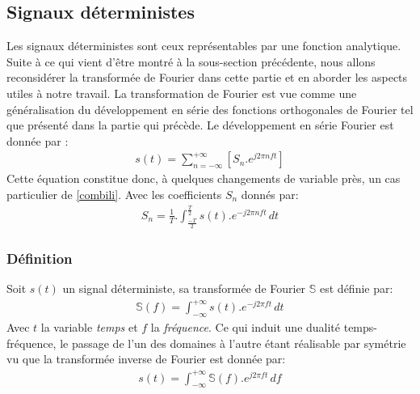 \subsection{Signaux déterministes}
Les signaux déterministes sont ceux représentables par une fonction analytique. Suite à ce qui vient d'être montré à la sous-section précédente, nous allons reconsidérer la transformée de Fourier dans cette partie et en aborder les aspects utiles à notre travail.
La transformation de Fourier est vue comme une généralisation du développement en série des fonctions orthogonales de Fourier tel que présenté dans la partie qui précède.
Le développement en série Fourier est donnée par \cite{Piskounov}:
\begin{eqnarray}\label{SrFourier}
s(t) = \sum_{n = -\infty}^{+\infty}[S_{n}.e^{j2{\pi}nft}]
\end{eqnarray}
Cette équation constitue donc, à quelques changements de variable près, un cas particulier de \ref{combili}.
Avec les coefficients $ S_{n} $ donnés par:
\begin{eqnarray}\label{CoefFourier}
S_{n}=\frac{1}{T}.\int_{\frac{-T}{2}}^{\frac{T}{2}}s(t).e^{-j2{\pi}nft}\,dt
\end{eqnarray}\newpage
\subsubsection{Définition \cite{KrCourse}}
Soit $ s(t) $ un signal déterministe, sa transformée de Fourier $ \mathbb{S} $ est définie par:
\begin{eqnarray}\label{TrFourier}
\mathbb{S}(f) = \int_{-\infty}^{+\infty}s(t).e^{-j2\pi ft}\,dt
\end{eqnarray}
Avec $ t $ la variable \emph{temps} et $ f $ la \emph{fréquence}. Ce qui induit une dualité temps-fréquence, le passage de l'un des domaines à l'autre étant réalisable par symétrie vu que la transformée inverse de Fourier est donnée par:
\begin{eqnarray}\label{TrInvFourier}
s(t) = \int_{-\infty}^{+\infty}\mathbb{S}(f).e^{j2\pi ft}\,df
\end{eqnarray}
